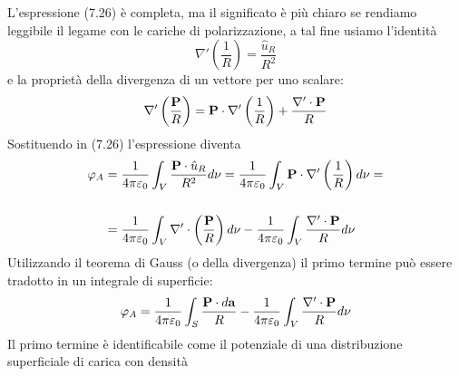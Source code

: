 \begin{center}
\end{center}
L'espressione (7.26) \`e completa, ma il significato \`e pi\`u chiaro se rendiamo leggibile il legame con le cariche di polarizzazione, a tal fine usiamo l'identit\`a 
\begin{equation*}
	\nabla' \left (\frac{1}{R}\right) = \frac{\hat{u}_{R}}{R^2}
\end{equation*}
e la propriet\`a della divergenza di un vettore per uno scalare:
\begin{equation*}
	\nabla' \left( \frac{\bold{P}}{R}\right) = \bold{P} \cdot \nabla' \left(\frac{1}{R} \right) + \frac{\nabla' \cdot \bold{P}}{R}
\end{equation*}
Sostituendo in (7.26) l'espressione diventa 
\begin{align*}
	\varphi_{A} & = \frac{1}{4 \pi \varepsilon_0} \int_{V} \frac{\bold{P} \cdot \hat{u}_{R}}{R^2} d \nu = \frac{1}{4 \pi \varepsilon_0} \int_{V} \bold{P} \cdot \nabla' \left( \frac{1}{R}\right)d\nu = \\ \rule{0pt}{30pt}
	& = \frac{1}{4 \pi \varepsilon_0} \int_{V} \nabla ' \cdot \left( \frac{\bold{P}}{R}\right)d\nu - \frac{1}{4 \pi \varepsilon_0} \int_{V} \frac{\nabla' \cdot \bold{P}}{R}d \nu
\end{align*}
Utilizzando il teorema di Gauss (o della divergenza) il primo termine pu\`o essere tradotto in un integrale di superficie:
\begin{equation}
	\varphi_{A} = \frac{1}{4 \pi \varepsilon_0} \int_{S} \frac{\bold{P} \cdot d\bold{a}}{R} - \frac{1}{4 \pi \varepsilon_0} \int_{V} \frac{\nabla' \cdot \bold{P}}{R}d \nu
\end{equation}
Il primo termine \`e identificabile come il potenziale di una distribuzione superficiale di carica con densit\`a 
